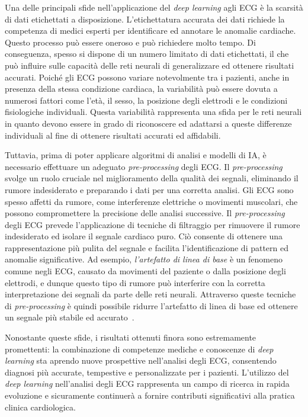 \documentclass[12pt,italian]{report}
\begin{document}
Una delle principali sfide nell'applicazione del \textit{deep learning} agli ECG è la scarsità di dati etichettati a disposizione. L'etichettatura accurata dei dati richiede la competenza di medici esperti per identificare ed annotare le anomalie cardiache. Questo processo può essere oneroso e può richiedere molto tempo. Di conseguenza, spesso si dispone di un numero limitato di dati etichettati, il che può influire sulle capacità delle reti neurali di generalizzare ed ottenere risultati accurati. Poiché gli ECG possono variare notevolmente tra i pazienti, anche in presenza della stessa condizione cardiaca, la variabilità può essere dovuta a numerosi fattori come l'età, il sesso, la posizione degli elettrodi e le condizioni fisiologiche individuali. Questa variabilità rappresenta una sfida per le reti neurali in quanto devono essere in grado di riconoscere ed adattarsi a queste differenze individuali al fine di ottenere risultati accurati ed affidabili.

Tuttavia, prima di poter applicare algoritmi di analisi e modelli di IA, è necessario effettuare un adeguato \textit{pre-processing} degli ECG. Il \textit{pre-processing} svolge un ruolo cruciale nel miglioramento della qualità dei segnali, eliminando il rumore indesiderato e preparando i dati per una corretta analisi. Gli ECG sono spesso affetti da rumore, come interferenze elettriche o movimenti muscolari, che possono compromettere la precisione delle analisi successive. Il \textit{pre-processing} degli ECG prevede l'applicazione di tecniche di filtraggio per rimuovere il rumore indesiderato ed isolare il segnale cardiaco puro. Ciò consente di ottenere una rappresentazione più pulita del segnale e facilita l'identificazione di pattern ed anomalie significative. Ad esempio, \textit{l'artefatto di linea di base} è un fenomeno comune negli ECG, causato da movimenti del paziente o dalla posizione degli elettrodi, e dunque questo tipo di rumore può interferire con la corretta interpretazione dei segnali da parte delle reti neurali. Attraverso queste tecniche di \textit{pre-processing} è quindi possibile ridurre l'artefatto di linea di base ed ottenere un segnale più stabile ed accurato~\cite{use}.

Nonostante queste sfide, i risultati ottenuti finora sono estremamente promettenti: la combinazione di competenze mediche e conoscenze di \textit{deep learning} sta aprendo nuove prospettive nell'analisi degli ECG, consentendo diagnosi più accurate, tempestive e personalizzate per i pazienti. L'utilizzo del \textit{deep learning} nell'analisi degli ECG rappresenta un campo di ricerca in rapida evoluzione e sicuramente continuerà a fornire contributi significativi alla pratica clinica cardiologica.
\end{document}
